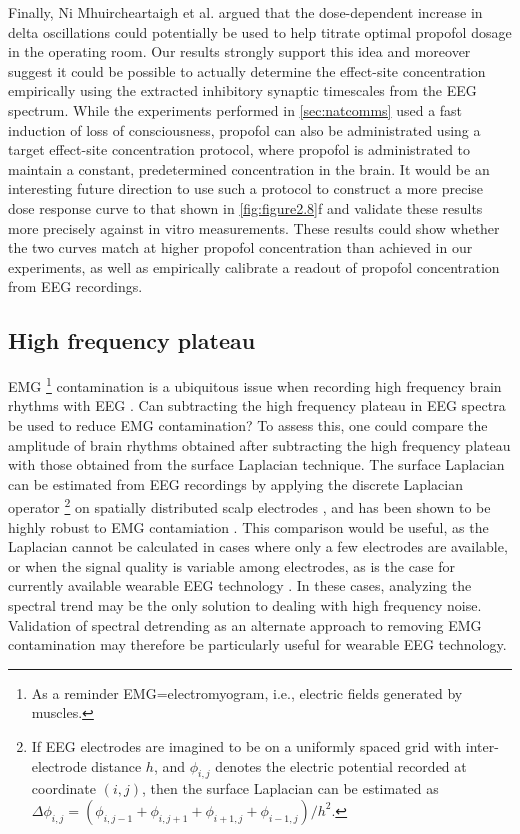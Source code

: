 Finally, Ni Mhuircheartaigh et al. \cite{NiMhuircheartaigh2013} argued that the dose-dependent increase in delta oscillations could potentially be used to help titrate optimal propofol dosage in the operating room. Our results strongly support this idea and moreover suggest it could be possible to actually determine the effect-site concentration empirically using the extracted inhibitory synaptic timescales from the EEG spectrum. While the experiments performed in \autoref{sec:natcomms} used a fast induction of loss of consciousness, propofol can also be administrated using a target effect-site concentration protocol, where propofol is administrated to maintain a constant, predetermined concentration in the brain. It would be an interesting future direction to use such a protocol to construct a more precise dose response curve to that shown in \autoref{fig:figure2.8}f and validate these results more precisely against in vitro measurements. These results could show whether the two curves match at higher propofol concentration than achieved in our experiments, as well as empirically calibrate a readout of propofol concentration from EEG recordings.

\subsection{High frequency plateau}
EMG \footnote[2]{As a reminder EMG=electromyogram, i.e., electric fields generated by muscles.} contamination is a ubiquitous issue when recording high frequency brain rhythms with EEG \cite{Muthukumaraswamy2013}. Can subtracting the high frequency plateau in EEG spectra be used to reduce EMG contamination? To assess this, one could compare the amplitude of brain rhythms obtained after subtracting the high frequency plateau with those obtained from the surface Laplacian technique. The surface Laplacian can be estimated from EEG recordings by applying the discrete Laplacian operator \footnote[3]{If EEG electrodes are imagined to be on a uniformly spaced grid with inter-electrode distance $h$, and $\phi_{i,j}$ denotes the electric potential recorded at coordinate $(i,j)$, then the surface Laplacian can be estimated as $\Delta\phi_{i,j} = (\phi_{i,j-1}+\phi_{i,j+1}+\phi_{i+1,j}+\phi_{i-1,j})/h^2$.} on spatially distributed scalp electrodes \cite{Carvalhaes2015}, and has been shown to be highly robust to EMG contamiation \cite{Fitzgibbon2013}. This comparison would be useful, as the Laplacian cannot be calculated in cases where only a few electrodes are available, or when the signal quality is variable among electrodes, as is the case for currently available wearable EEG technology \cite{Mihajlovic2015}. In these cases, analyzing the spectral trend may be the only solution to dealing with high frequency noise. Validation of spectral detrending as an alternate approach to removing EMG contamination may therefore be particularly useful for wearable EEG technology.


